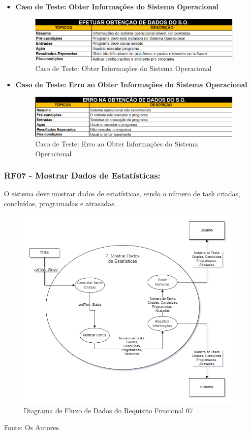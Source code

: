 \documentclass[a4paper,12pt]{article}
\begin{document}
\pagebreak
\begin{itemize}
	\item\textbf{Caso de Teste: Obter Informações do Sistema Operacional}
	\begin{figure}[H]
		\centering
		\includegraphics[scale=0.75]{UnitTest/trueCase/getOSInfo.png}
		\caption{Caso de Teste: Obter Informações do Sistema Operacional}
	\end{figure}

	\item\textbf{Caso de Teste: Erro ao Obter Informações do Sistema Operacional}
	\begin{figure}[H]
		\centering
		\includegraphics[scale=0.75]{UnitTest/falseCase/getOSInfo.png}
		\caption{Caso de Teste: Erro ao Obter Informações do Sistema Operacional}
	\end{figure}
\end{itemize}

\pagebreak
\subsubsection{RF07 - Mostrar Dados de Estatísticas:}
O sistema deve mostrar dados de estatísticas, sendo o número de task criadas, concluídas, programadas e atrasadas.
\begin{figure}[H]
	\centering
	\includegraphics[scale=0.45]{DFDs/RF07.drawio.png}
	\caption{Diagrama de Fluxo de Dados do Requisito Funcional 07}
\end{figure}
\noindent Fonte: Os Autores.
\end{document}
